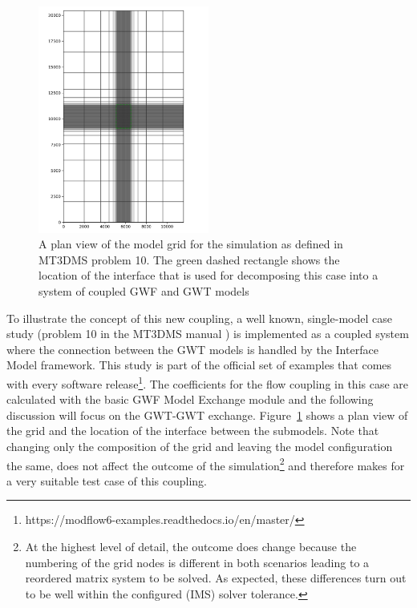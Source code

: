 \begin{figure}[!t]
	\begin{center}
	\includegraphics[width=0.5\textwidth]{./Figures/InterfaceModel/mt3dms-p10-modelgrid.png}
	\caption[A plan view of the model grid from MT3DMS problem 10]{A plan view of the model grid for the simulation as defined in MT3DMS problem 10. The green dashed rectangle shows the location of the interface that is used for decomposing this case into a system of coupled GWF and GWT models}
	\label{fig:gwtgwt-fullgrid}
	\end{center}
\end{figure}

To illustrate the concept of this new coupling, a well known, single-model case study (problem 10 in the MT3DMS manual \cite{zheng1999mt3dms}) is implemented as a coupled system where the connection between the GWT models is handled by the Interface Model framework. This study is part of the official set of examples that comes with every \mf software release\footnote{https://modflow6-examples.readthedocs.io/en/master/}. The coefficients for the flow coupling in this case are calculated with the basic GWF Model Exchange module and the following discussion will focus on the GWT-GWT exchange. Figure~\ref{fig:gwtgwt-fullgrid} shows a plan view of the grid and the location of the interface between the submodels. Note that changing only the composition of the grid and leaving the model configuration the same, does not affect the outcome of the simulation\footnote{At the highest level of detail, the outcome does change because the numbering of the grid nodes is different in both scenarios leading to a reordered matrix system to be solved. As expected, these differences turn out to be well within the configured (IMS) solver tolerance.} and therefore makes for a very suitable test case of this coupling.

